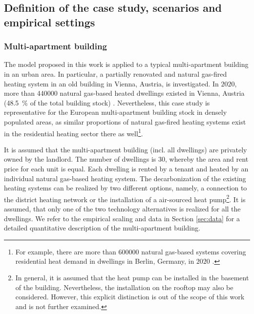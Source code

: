 \subsection{Definition of the case study, scenarios and empirical settings}\label{met:empirical}
\subsubsection{Multi-apartment building}
The model proposed in this work is applied to a typical multi-apartment building in an urban area. In particular, a partially renovated and natural gas-fired heating system in an old building in Vienna, Austria, is investigated. In $2020$, more than \SI{440000}{} natural gas-based heated dwellings existed in Vienna, Austria (\SI{48.5}{\%} of the total building stock) \cite{statistikaustriaheizen}. Nevertheless, this case study is representative for the European multi-apartment building stock in densely populated areas, as similar proportions of natural gas-fired heating systems exist in the residential heating sector there as well\footnote{For example, there are more than \SI{600000}{} natural gas-based systems covering residential heat demand in dwellings in Berlin, Germany, in $2020$ \cite{BDEW2019}.}.\vspace{0.5cm}

It is assumed that the multi-apartment building (incl. all dwellings) are privately owned by the landlord. The number of dwellings is $30$, whereby the area and rent price for each unit is equal. Each dwelling is rented by a tenant and heated by an individual natural gas-based heating system. The decarbonization of the existing heating systems can be realized by two different options, namely, a connection to the district heating network or the installation of a air-sourced heat pump\footnote{In general, it is assumed that the heat pump can be installed in the basement of the building. Nevertheless, the installation on the rooftop may also be considered. However, this explicit distinction is out of the scope of this work and is not further examined.}. It is assumed, that only one of the two technology alternatives is realized for all the dwellings. We refer to the empirical scaling and data in Section \ref{sec:data} for a detailed quantitative description of the multi-apartment building. 


